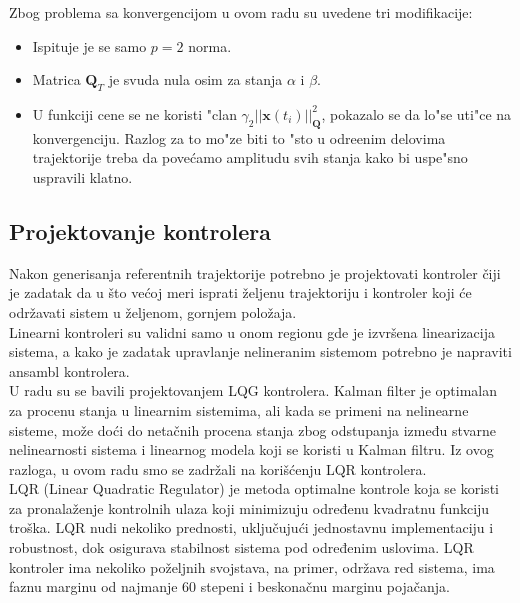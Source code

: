\documentclass[a4paper,11pt]{article}
\theoremstyle{definition} \newtheorem{deff}{Definicija}[section]
\theoremstyle{definition} \newtheorem{prim}[deff]{Primer}
\theoremstyle{plain} \newtheorem{teor}[deff]{Teorema}
\begin{document}
	Zbog problema sa konvergencijom u ovom radu su uvedene tri modifikacije:
	\begin{itemize}
		\item Ispituje je se samo $p=2$ norma.
		\item Matrica $\mathbf{Q}_T$ je svuda nula osim za stanja $\alpha$ i $\beta$.
		\item U funkciji cene se ne koristi "clan $\gamma_2||\mathbf{x}(t_i)||^2_{\mathbf{Q}}$, pokazalo se da lo"se uti"ce na konvergenciju. Razlog za to mo"ze biti to "sto u odre\dj enim delovima trajektorije treba da pove\'camo amplitudu svih stanja kako bi uspe"sno uspravili klatno.
	\end{itemize}
	
	
	
	
	
	
	
	
	
	
	
	 
	
	
	\newpage
	\subsection{Projektovanje kontrolera}\label{sec:LQR}
	
	Nakon generisanja referentnih trajektorije potrebno je projektovati kontroler čiji je zadatak da u što većoj meri isprati željenu trajektoriju i kontroler koji će održavati sistem u željenom, gornjem položaja. \\
	
	Linearni kontroleri su validni samo u onom regionu gde je izvršena linearizacija sistema, a kako je zadatak upravlanje nelineranim sistemom potrebno je napraviti ansambl kontrolera. \\
	
	U radu \cite{inicijalna} su se bavili projektovanjem LQG kontrolera. Kalman filter je optimalan za procenu stanja u linearnim sistemima, ali kada se primeni na nelinearne sisteme, može doći do netačnih procena stanja zbog odstupanja između stvarne nelinearnosti sistema i linearnog modela koji se koristi u Kalman filtru. Iz ovog razloga, u ovom radu smo se zadržali na korišćenju LQR kontrolera. \\
	
	LQR (Linear Quadratic Regulator) je metoda optimalne kontrole koja se koristi za pronalaženje kontrolnih ulaza koji minimizuju određenu kvadratnu funkciju troška. LQR nudi nekoliko prednosti, uključujući jednostavnu implementaciju i robustnost, dok osigurava stabilnost sistema pod određenim uslovima. LQR kontroler ima nekoliko poželjnih svojstava, na primer, održava red sistema, ima faznu marginu od najmanje 60 stepeni i beskonačnu marginu pojačanja.\\
	
\end{document}

